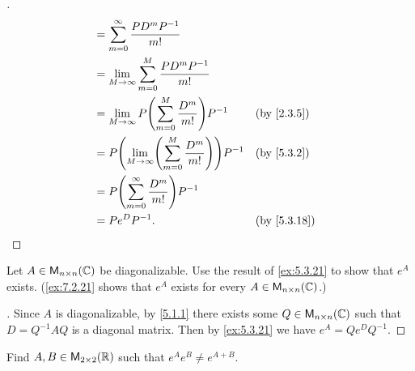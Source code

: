 \begin{proof}[]
\begin{align*}
        & = \sum_{m = 0}^\infty \frac{P D^m P^{-1}}{m!}                                           \\
        & = \Lim_{M \to \infty} \sum_{m = 0}^M \frac{P D^m P^{-1}}{m!}                            \\
        & = \Lim_{M \to \infty} P \pa{\sum_{m = 0}^M \frac{D^m}{m!}} P^{-1}      &  & \by{2.3.5}  \\
        & = P \pa{\Lim_{M \to \infty} \pa{\sum_{m = 0}^M \frac{D^m}{m!}}} P^{-1} &  & \by{5.3.2}  \\
        & = P \pa{\sum_{m = 0}^\infty \frac{D^m}{m!}} P^{-1}                                      \\
        & = P e^D P^{-1}.                                                        &  & \by{5.3.18}
  \end{align*}
\end{proof}

\begin{ex}\label{ex:5.3.22}
  Let \(A \in \ms[n][n][\C]\) be diagonalizable.
  Use the result of \cref{ex:5.3.21} to show that \(e^A\) exists.
  (\cref{ex:7.2.21} shows that \(e^A\) exists for every \(A \in \ms[n][n][\C]\).)
\end{ex}

\begin{proof}[]
  Since \(A\) is diagonalizable, by \cref{5.1.1} there exists some \(Q \in \ms[n][n][\C]\) such that \(D = Q^{-1} A Q\) is a diagonal matrix.
  Then by \cref{ex:5.3.21} we have \(e^A = Q e^D Q^{-1}\).
\end{proof}

\begin{ex}\label{ex:5.3.23}
  Find \(A, B \in \ms[2][2][\R]\) such that \(e^A e^B \neq e^{A + B}\).
\end{ex}

